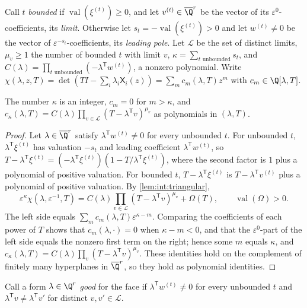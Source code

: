 Call $t$ \emph{bounded} if $\operatorname{val}(\xi^{(t)})\ge0$, and let
$v^{(t)}\in\overline\Q^r$ be the vector of its $\varepsilon^0$-coefficients, its
\emph{limit}. Otherwise let $s_t=-\operatorname{val}(\xi^{(t)})>0$ and let
$w^{(t)}\ne0$ be the vector of $\varepsilon^{-s_t}$-coefficients, its
\emph{leading pole}. Let $\mathcal L$ be the set of distinct limits, $\mu_v\ge1$
the number of bounded $t$ with limit $v$, $\kappa=\sum_{t\text{ unbounded}}s_t$,
and $C(\lambda)=\prod_{t\text{ unbounded}}(-\lambda^{\mathsf T}w^{(t)})$, a nonzero
polynomial. Write
$\chi(\lambda,z,T)=\det(TI-\sum_i\lambda_i\mathsf X_i(z))=\sum_mc_m(\lambda,T)z^m$ with
$c_m\in\Q[\lambda,T]$.

\begin{lemma}\label{lem:int:leading}
The number $\kappa$ is an integer, $c_m=0$ for $m>\kappa$, and
$c_\kappa(\lambda,T)=C(\lambda)\prod_{v\in\mathcal L}(T-\lambda^{\mathsf T}v)^{\mu_v}$
as polynomials in $(\lambda,T)$.
\end{lemma}

\begin{proof}
Let $\lambda\in\overline\Q^r$ satisfy $\lambda^{\mathsf T}w^{(t)}\ne0$ for every
unbounded $t$. For unbounded $t$, $\lambda^{\mathsf T}\xi^{(t)}$ has valuation
$-s_t$ and leading coefficient $\lambda^{\mathsf T}w^{(t)}$, so
$T-\lambda^{\mathsf T}\xi^{(t)}=(-\lambda^{\mathsf T}\xi^{(t)})
(1-T/\lambda^{\mathsf T}\xi^{(t)})$, where the second factor is $1$ plus a
polynomial of positive valuation. For bounded $t$,
$T-\lambda^{\mathsf T}\xi^{(t)}$ is $T-\lambda^{\mathsf T}v^{(t)}$ plus a
polynomial of positive valuation. By \cref{lem:int:triangular},
\[
 \varepsilon^\kappa\chi(\lambda,\varepsilon^{-1},T)
 =C(\lambda)\prod_{v\in\mathcal L}(T-\lambda^{\mathsf T}v)^{\mu_v}+\Omega(T),
 \qquad\operatorname{val}(\Omega)>0 .
\]
The left side equals $\sum_mc_m(\lambda,T)\varepsilon^{\kappa-m}$. Comparing the
coefficients of each power of $T$ shows that $c_m(\lambda,\cdot)=0$ when
$\kappa-m<0$, and that the $\varepsilon^0$-part of the left side equals the
nonzero first term on the right; hence some $m$ equals $\kappa$, and
$c_\kappa(\lambda,T)=C(\lambda)\prod_v(T-\lambda^{\mathsf T}v)^{\mu_v}$. These
identities hold on the complement of finitely many hyperplanes in
$\overline\Q^r$, so they hold as polynomial identities.
\end{proof}

Call a form $\lambda\in\Q^r$ \emph{good} for the face if
$\lambda^{\mathsf T}w^{(t)}\ne0$ for every unbounded $t$ and
$\lambda^{\mathsf T}v\ne\lambda^{\mathsf T}v'$ for distinct $v,v'\in\mathcal L$.

